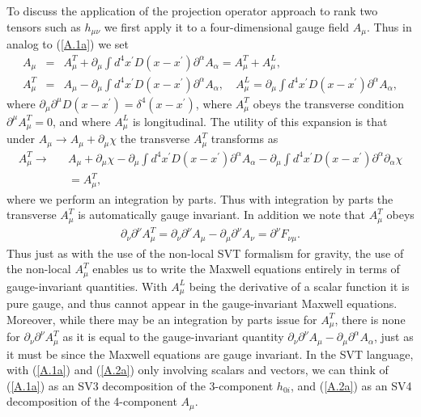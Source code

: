 To discuss the application of the projection operator approach to rank two tensors such as $h_{\mu\nu}$ we first apply it to a four-dimensional gauge field $A_{\mu}$. Thus in analog to (\ref{A.1a}) we set
%
\begin{eqnarray}
A_{\mu}&=&A^T_{\mu}+\partial_{\mu}\int d^4x^{\prime}D(x-x^{\prime})\partial^{\alpha}A_{\alpha}=A^T_{\mu}+A^L_{\mu},
\\
A^T_{\mu}&=&A_{\mu}-\partial_{\mu}\int d^4x^{\prime}D(x-x^{\prime})\partial^{\alpha}A_{\alpha},\quad A_{\mu}^L=\partial_{\mu}\int d^4x^{\prime}D(x-x^{\prime})\partial^{\alpha}A_{\alpha},
\nonumber
\label{A.2a}
\end{eqnarray}
%
where $\partial_{\mu}\partial^{\mu}D(x-x^{\prime})=\delta^4(x-x^{\prime})$, where $A^T_{\mu}$ obeys the transverse condition $\partial^{\mu}A^T_{\mu}=0$, and where $A_{\mu}^L$ is longitudinal. The utility of this expansion is that under  $A_{\mu}\rightarrow A_{\mu}+\partial_{\mu}\chi$ the transverse $A^T_{\mu}$ transforms as 
%
\begin{eqnarray}
A^T_{\mu}\rightarrow&& A_{\mu}+\partial_{\mu}\chi-\partial_{\mu}\int d^4x^{\prime}D(x-x^{\prime})\partial^{\alpha}A_{\alpha}
-\partial_{\mu}\int d^4x^{\prime}D(x-x^{\prime})\partial^{\alpha}\partial_{\alpha}\chi 
\nonumber\\
&&=A_{\mu}^T,
\label{A.3a}
\end{eqnarray}
%
where we perform an integration by parts. Thus with integration by parts the transverse $A^T_{\mu}$ is automatically gauge invariant. In addition we note that $A_{\mu}^T$ obeys 
%
\begin{eqnarray}
\partial_{\nu}\partial^{\nu}A^T_{\mu}=\partial_{\nu}\partial^{\nu}A_{\mu}-\partial_{\mu}\partial^{\nu}A_{\nu}=\partial^{\nu}F_{\nu\mu}.
\label{A.4a}
\end{eqnarray}
%
Thus just as with the use of the non-local SVT formalism for gravity, the use of the non-local $A_{\mu}^T$ enables us to write the Maxwell equations entirely in terms of gauge-invariant quantities. With $A_{\mu}^L$ being the derivative of a scalar function it is pure gauge, and thus cannot appear in the gauge-invariant Maxwell equations. Moreover, while there may be an integration by parts issue for $A_{\mu}^T$, there is none for $\partial_{\nu}\partial^{\nu}A^T_{\mu}$ as it is equal to the gauge-invariant quantity $\partial_{\nu}\partial^{\nu}A_{\mu}-\partial_{\mu}\partial^{\alpha}A_{\alpha}$, just as it must be since the Maxwell equations are gauge invariant.
In the SVT language, with (\ref{A.1a}) and (\ref{A.2a}) only involving scalars and vectors, we can think of (\ref{A.1a}) as an SV3 decomposition of the 3-component $h_{0i}$, and (\ref{A.2a}) as an SV4 decomposition of the 4-component $A_{\mu}$.

